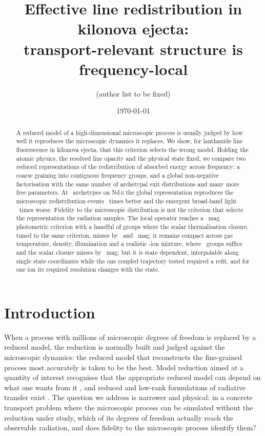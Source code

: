 \documentclass[aps,prl,twocolumn,superscriptaddress,nofootinbib,longbibliography]{revtex4-2}
\begin{document}
\title{Effective line redistribution in kilonova ejecta:\\
       transport-relevant structure is frequency-local}
\author{(author list to be fixed)}
\date{\today}

\begin{abstract}
A reduced model of a high-dimensional microscopic process is usually
judged by how well it reproduces the microscopic dynamics it replaces. We show, for lanthanide
line fluorescence in kilonova ejecta, that this criterion selects the wrong
model. Holding the atomic physics, the resolved line opacity and the
physical state fixed, we compare two reduced representations of the
redistribution of absorbed energy across frequency: a coarse graining into
contiguous frequency groups, and a global non-negative factorisation with
the same number of archetypal exit distributions and many more free
parameters. At \PBContrastK\ archetypes on Nd\,\textsc{ii} the global
representation reproduces the microscopic redistribution events
\PBNdEventRatio\ times better and the emergent broad-band light
\PBNdBandRatio\ times worse. Fidelity to the microscopic distribution is
not the criterion that selects the representation the radiation samples.
The local operator reaches a \PBdmMax~mag photometric criterion with a
handful of groups where the scalar thermalisation closure, tuned to the
same criterion, misses by \PBNdEpsMMErr\ and \PBCeEpsMMErr~mag; it
remains compact across gas temperature, density, illumination and a
realistic \PBBlendNIons-ion mixture, where \PBBlendKrec\ groups suffice
and the scalar closure misses by \PBBlendEpsMMErr~mag; but it is state
dependent, interpolable along single state coordinates while the one
coupled trajectory tested required a refit, and for one ion its required
resolution changes with the state.
\end{abstract}

\maketitle

\section{Introduction}
\label{sec:intro}
When a process with millions of microscopic degrees of freedom is replaced
by a reduced model, the reduction is normally built and judged against the
microscopic dynamics: the reduced model that reconstructs the fine-grained
process most accurately is taken to be the best. Model reduction aimed at a quantity of interest recognises that the
appropriate reduced model can depend on what one wants from it
\citep{zahm2017,benner2015}, and reduced and low-rank formulations of
radiative transfer exist \citep{peng2020}. The
question we address is narrower and physical: in a concrete transport
problem where the microscopic process can be simulated without the
reduction under study, which of its degrees of freedom actually reach the
observable radiation, and does fidelity to the microscopic process
identify them?
\end{document}
